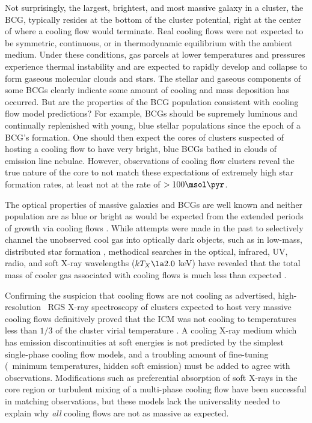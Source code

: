 Not surprisingly, the largest, brightest, and most massive galaxy in a
cluster, the BCG, typically resides at the bottom of the cluster
potential, right at the center of where a cooling flow would
terminate. Real cooling flows were not expected to be symmetric,
continuous, or in thermodynamic equilibrium with the ambient
medium. Under these conditions, gas parcels at lower temperatures and
pressures experience thermal instability and are expected to rapidly
develop and collapse to form gaseous molecular clouds and stars. The
stellar and gaseous components of some BCGs clearly indicate some
amount of cooling and mass deposition has occurred. But are the
properties of the BCG population consistent with cooling flow model
predictions? For example, BCGs should be supremely luminous and
continually replenished with young, blue stellar populations since the
epoch of a BCG's formation. One should then expect the cores of
clusters suspected of hosting a cooling flow to have very bright, blue
BCGs bathed in clouds of emission line nebulae. However, observations
of cooling flow clusters reveal the true nature of the core to not
match these expectations of extremely high star formation rates, at
least not at the rate of $> 100 \msol
\pyr$.

The optical properties of massive galaxies and BCGs are well known and
neither population are as blue or bright as would be expected from the
extended periods of growth via cooling flows
\citep{1996MNRAS.283.1388M, 1996Natur.384..439S, 1996AJ....112..839C,
crawford99}. While attempts were made in the past to selectively
channel the unobserved cool gas into optically dark objects, such as
in low-mass, distributed star formation
\citep[\eg][]{1991ApJ...369L...1P}, methodical searches in the
optical, infrared, UV, radio, and soft X-ray wavelengths ($kT_X \la
2.0$ keV) have revealed that the total mass of cooler gas associated
with cooling flows is much less than expected \citep{hu85, heckman89,
  mcnamara90, odea94, 1994ApJ...436..669O, 1994AJ....107..448A,
  1994A&A...281..673M, voit95, 1997MNRAS.284L...1J,
  1998ApJ...494L.155F, 2000ApJ...545..670D, 2003ApJ...594L..13E}.

Confirming the suspicion that cooling flows are not cooling as
advertised, high-resolution \xmm\ RGS X-ray spectroscopy of clusters
expected to host very massive cooling flows definitively proved that
the ICM was not cooling to temperatures less than $1/3$ of the cluster
virial temperature \citep{peterson01, tamura01, peterson03}. A cooling
X-ray medium which has emission discontinuities at soft energies is
not predicted by the simplest single-phase cooling flow models, and a
troubling amount of fine-tuning (\eg\ minimum temperatures, hidden
soft emission) must be added to agree with observations. Modifications
such as preferential absorption of soft X-rays in the core region
\citep[\eg][]{1993MNRAS.262..901A} or turbulent mixing of a
multi-phase cooling flow \citep[\eg][]{2002MNRAS.332L..50F} have been
successful in matching observations, but these models lack the
universality needed to explain why {\it{all}} cooling flows are not as
massive as expected.

